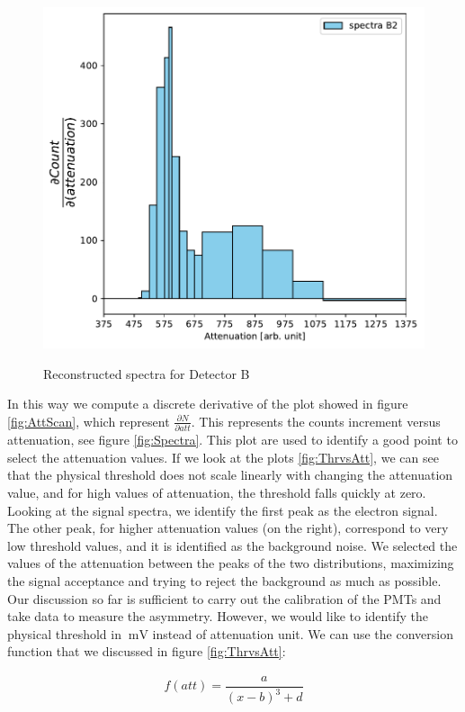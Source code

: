 \begin{figure}[h]
{\includegraphics[scale = 0.5]{Analysis/CalibrationPMT/B2.pdf}}
\caption{Reconstructed spectra for Detector B}
\end{figure}

In this way we compute a discrete derivative of the plot showed in figure \ref{fig:AttScan}, which represent $\frac{\partial N}{\partial att}$. This represents the counts increment versus attenuation, see figure \ref{fig:Spectra}.
This plot are used to identify a good point to select the attenuation values. If we look at the plots \ref{fig:ThrvsAtt}, we can see that the physical threshold does not scale linearly with changing the attenuation value, and for high values of attenuation, the threshold falls quickly at zero. 
Looking at the signal spectra, we identify the first peak as the electron signal. The other peak, for higher attenuation values (on the right), correspond to very low threshold values, and it is identified as the background noise. 
We selected the values of the attenuation between the peaks of the two distributions, maximizing the signal acceptance and trying to reject the background as much as possible.
Our discussion so far is sufficient to carry out the calibration of the PMTs and take data to measure the asymmetry. However, we would like to identify the physical threshold in $\SI{}{\milli \volt}$ instead of attenuation unit. We can use the conversion function that we discussed in figure \ref{fig:ThrvsAtt}:

\begin{align*}
f(att) = \dfrac{a}{(x - b)^{3} + d}
\end{align*} 

